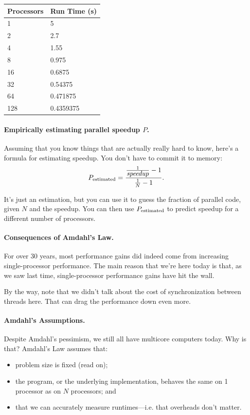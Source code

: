 \documentclass[a4paper]{report}
\begin{document}
\begin{center}
	\begin{tabular}{l|l}
	\textbf{Processors} & \textbf{Run Time (s)} \\ \hline
	1 & 5\\
	2 & 2.7\\
	4 & 1.55\\
	8 & 0.975\\
	16 & 0.6875 \\
	32 & 0.54375 \\
	64 & 0.471875 \\
	128 & 0.4359375\\
	\end{tabular}
\end{center}

   \paragraph{Empirically estimating parallel speedup $P$.}
Assuming that you know things that are actually really hard to know, here's a formula for estimating speedup. You don't have to commit it to memory:
  \[P_{\mbox{\scriptsize estimated}} = \frac{\frac{1}{\mbox{\em speedup}}-1}{\frac{1}{N}-1}.\]

It's just an estimation, but you can use it to guess the fraction of parallel code, given $N$ and the speedup. You can then use $P_{\mbox{\scriptsize estimated}}$ to predict speedup for a different number of processors.

\paragraph{Consequences of Amdahl's Law.}
For over 30 years, most performance gains did indeed come from
increasing single-processor performance. The main reason that we're
here today is that, as we saw last time,
single-processor performance gains have hit the wall.

By the way, note that we didn't talk about the cost of synchronization
between threads here. That can drag the performance down even more.

\paragraph{Amdahl's Assumptions.}
Despite Amdahl's pessimism, we still all have multicore computers today.
Why is that? Amdahl's Law assumes that:
\begin{itemize}[noitemsep]
    \item problem size is fixed (read on);
    \item the program, or the underlying implementation, behaves the same on 1 processor as on $N$ processors; and
    \item that we can accurately measure runtimes---i.e. that overheads don't matter.
\end{itemize}
\end{document}
